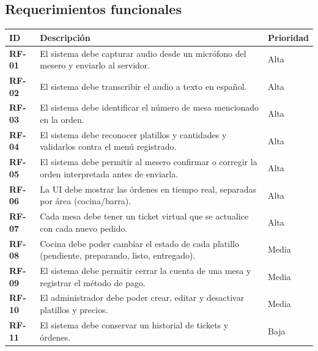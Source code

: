 \documentclass[11pt,letterpaper]{article}
\newcommand{\tabhead}[1]{\textbf{\color{white}#1}}
\newcommand{\encabezado}{\rowcolor{azulprincipal}}
\begin{document}
\subsection{Requerimientos funcionales}
\begin{longtable}{@{}>{\bfseries}p{1.4cm} p{9cm} p{2.4cm}@{}}
\toprule
\encabezado \tabhead{ID} & \tabhead{Descripción} & \tabhead{Prioridad} \\
\midrule
\endhead
RF-01 & El sistema debe capturar audio desde un micrófono del mesero y enviarlo al servidor. & Alta \\
RF-02 & El sistema debe transcribir el audio a texto en español. & Alta \\
RF-03 & El sistema debe identificar el número de mesa mencionado en la orden. & Alta \\
RF-04 & El sistema debe reconocer platillos y cantidades y validarlos contra el menú registrado. & Alta \\
RF-05 & El sistema debe permitir al mesero confirmar o corregir la orden interpretada antes de enviarla. & Alta \\
RF-06 & La UI debe mostrar las órdenes en tiempo real, separadas por área (cocina/barra). & Alta \\
RF-07 & Cada mesa debe tener un ticket virtual que se actualice con cada nuevo pedido. & Alta \\
RF-08 & Cocina debe poder cambiar el estado de cada platillo (pendiente, preparando, listo, entregado). & Media \\
RF-09 & El sistema debe permitir cerrar la cuenta de una mesa y registrar el método de pago. & Media \\
RF-10 & El administrador debe poder crear, editar y desactivar platillos y precios. & Media \\
RF-11 & El sistema debe conservar un historial de tickets y órdenes. & Baja \\
\bottomrule
\end{longtable}
\end{document}

